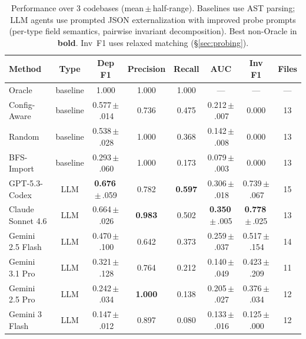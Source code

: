 \documentclass{article}
\newcommand{\pms}[1]{\,{\scriptsize$\pm$\,#1}}
\begin{document}
\begin{table}[!ht]
\centering
\caption{Performance over 3 codebases (mean\pms{half-range}). Baselines use AST parsing; LLM agents use prompted JSON externalization with improved probe prompts (per-type field semantics, pairwise invariant decomposition). Best non-Oracle in \textbf{bold}. Inv~F1 uses relaxed matching (\S\ref{sec:probing}).}
\label{tab:results}
\begin{tabular}{@{}lccccccc@{}}
\toprule
\textbf{Method} & \textbf{Type} & \textbf{Dep F1} & \textbf{Precision} & \textbf{Recall} & \textbf{AUC} & \textbf{Inv F1} & \textbf{Files} \\
\midrule
Oracle          & baseline & 1.000 & 1.000 & 1.000 & ---   & --- & --- \\
Config-Aware    & baseline & 0.577\pms{.014} & 0.736 & 0.475 & 0.212\pms{.007} & 0.000 & 13 \\
Random          & baseline & 0.538\pms{.028} & 1.000 & 0.368 & 0.142\pms{.008} & 0.000 & 13 \\
BFS-Import      & baseline & 0.293\pms{.060} & 1.000 & 0.173 & 0.079\pms{.003} & 0.000 & 13 \\
\midrule
GPT-5.3-Codex   & LLM     & \textbf{0.676}\pms{.059} & 0.782 & \textbf{0.597} & 0.306\pms{.018} & 0.739\pms{.067} & 15 \\
Claude Sonnet 4.6 & LLM   & 0.664\pms{.026} & \textbf{0.983} & 0.502 & \textbf{0.350}\pms{.005} & \textbf{0.778}\pms{.025} & 13 \\
Gemini 2.5 Flash & LLM    & 0.470\pms{.100} & 0.642 & 0.373 & 0.259\pms{.037} & 0.517\pms{.154} & 14 \\
Gemini 3.1 Pro  & LLM     & 0.321\pms{.128} & 0.764 & 0.212 & 0.140\pms{.049} & 0.423\pms{.209} & 11 \\
Gemini 2.5 Pro  & LLM     & 0.242\pms{.034} & \textbf{1.000} & 0.138 & 0.205\pms{.027} & 0.376\pms{.034} & 12 \\
Gemini 3 Flash  & LLM     & 0.147\pms{.012} & 0.897 & 0.080 & 0.133\pms{.016} & 0.125\pms{.000} & 12 \\
\bottomrule
\end{tabular}
\end{table}
\end{document}

